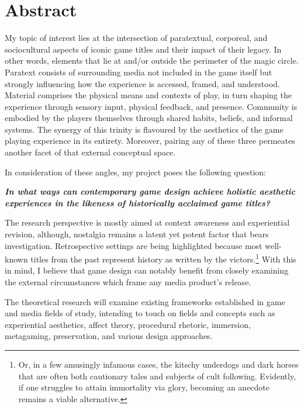 \documentclass[12pt,oneside]{book}
\begin{document}
\chapter*{Abstract}
  \begin{center}\begin{singlespace}
    My topic of interest lies at the intersection of paratextual, corporeal, and sociocultural aspects of iconic game titles and their impact of their legacy.
    In other words, elements that lie at and/or outside the perimeter of the magic circle\parencite{huizinga}.
    Paratext consists of surrounding media not included in the game itself but strongly influencing how the experience is accessed, framed, and understood.
    Material comprises the physical means and contexts of play, in turn shaping the experience through sensory input, physical feedback, and presence. 
    Community is embodied by the players themselves through shared habits, beliefs, and informal systems.
    The synergy of this trinity is flavoured by the aesthetics of the game playing experience in its entirety.
    Moreover, pairing any of these three permeates another facet of that external conceptual space.\par
    In consideration of these angles, my project poses the following question:
    \begin{displayquote}
        \textbf{\textit{In what ways can contemporary game design achieve holistic aesthetic experiences in the likeness of historically acclaimed game titles?}}
    \end{displayquote}
    The research perspective is mostly aimed at context awareness and experiential revision, although, nostalgia remains a latent yet potent factor that bears investigation.
    Retrospective settings are being highlighted because most well-known titles from the past represent history as written by the victors.\footnote{Or, in a few amusingly infamous cases, the kitschy underdogs and dark horses that are often both cautionary tales and subjects of cult following. Evidently, if one struggles to attain immortality via glory, becoming an anecdote remains a viable alternative.}
    With this in mind, I believe that game design can notably benefit from closely examining the external circumstances which frame any media product's release.\par
    The theoretical research will examine existing frameworks established in game and media fields of study, intending to touch on fields and concepts such as 
    experiential aesthetics, affect theory, procedural rhetoric, immersion, metagaming, preservation, and various design approaches.

\end{singlespace}
\end{center}
\end{document}
